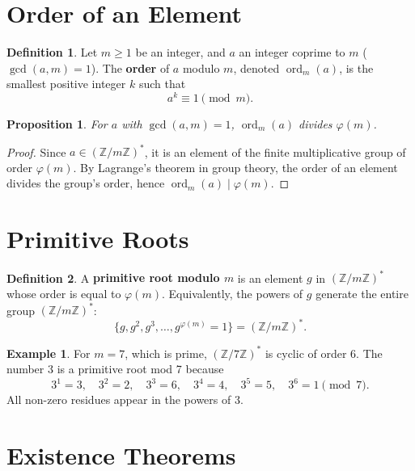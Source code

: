 \documentclass[12pt,openany]{book}
\theoremstyle{definition}
\newtheorem{definition}{Definition}[chapter]
\newtheorem{example}{Example}[chapter]
\theoremstyle{plain}
\newtheorem{proposition}{Proposition}[chapter]
\theoremstyle{remark}
\begin{document}
\section{Order of an Element}

\begin{definition}
  Let $m \geq 1$ be an integer, and $a$ an integer coprime to $m$ (\(\gcd(a,m) = 1\)). The \textbf{order} of $a$ modulo $m$, denoted $\operatorname{ord}_m(a)$, is the smallest positive integer $k$ such that
  \[
    a^k \equiv 1 \pmod{m}.
  \]
\end{definition}

\begin{proposition}
  For $a$ with $\gcd(a,m) = 1$, $\operatorname{ord}_m(a)$ divides $\varphi(m)$.
\end{proposition}

\begin{proof}
  Since $a \in (\mathbb{Z}/m\mathbb{Z})^*$, it is an element of the finite multiplicative group of order $\varphi(m)$. By Lagrange's theorem in group theory, the order of an element divides the group's order, hence $\operatorname{ord}_m(a) \mid \varphi(m)$.
\end{proof}

\section{Primitive Roots}

\begin{definition}
  A \textbf{primitive root modulo $m$} is an element $g$ in $(\mathbb{Z}/m\mathbb{Z})^*$ whose order is equal to $\varphi(m)$. Equivalently, the powers of $g$ generate the entire group $(\mathbb{Z}/m\mathbb{Z})^*$:
  \[
    \{g, g^2, g^3, \dots, g^{\varphi(m)} = 1\} = (\mathbb{Z}/m\mathbb{Z})^*.
  \]
\end{definition}

\begin{example}
  For $m=7$, which is prime, $(\mathbb{Z}/7\mathbb{Z})^*$ is cyclic of order 6. The number 3 is a primitive root mod 7 because
  \[
    3^1 = 3, \quad 3^2 = 2, \quad 3^3 = 6, \quad 3^4 = 4, \quad 3^5 = 5, \quad 3^6 = 1 \pmod 7.
  \]
  All non-zero residues appear in the powers of 3.
\end{example}

\section{Existence Theorems}
\end{document}
